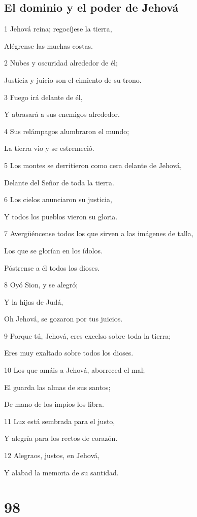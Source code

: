 \section*{El dominio y el poder de Jehová}

\par 1 Jehová reina; regocíjese la tierra,
\par Alégrense las muchas costas.
\par 2 Nubes y oscuridad alrededor de él;
\par Justicia y juicio son el cimiento de su trono.
\par 3 Fuego irá delante de él,
\par Y abrasará a sus enemigos alrededor.
\par 4 Sus relámpagos alumbraron el mundo;
\par La tierra vio y se estremeció.
\par 5 Los montes se derritieron como cera delante de Jehová,
\par Delante del Señor de toda la tierra.
\par 6 Los cielos anunciaron su justicia,
\par Y todos los pueblos vieron su gloria.
\par 7 Avergüéncense todos los que sirven a las imágenes de talla,
\par Los que se glorían en los ídolos.
\par Póstrense a él todos los dioses.
\par 8 Oyó Sion, y se alegró;
\par Y la hijas de Judá,
\par Oh Jehová, se gozaron por tus juicios.
\par 9 Porque tú, Jehová, eres excelso sobre toda la tierra;
\par Eres muy exaltado sobre todos los dioses.
\par 10 Los que amáis a Jehová, aborreced el mal;
\par El guarda las almas de sus santos;
\par De mano de los impíos los libra.
\par 11 Luz está sembrada para el justo,
\par Y alegría para los rectos de corazón.
\par 12 Alegraos, justos, en Jehová,
\par Y alabad la memoria de su santidad.

\chapter{98}

